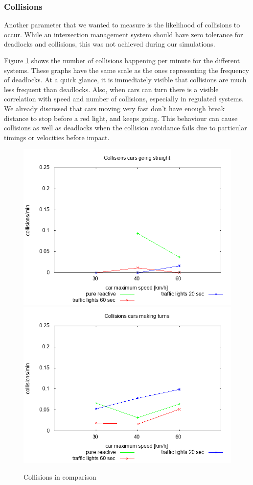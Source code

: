 \subsubsection{Collisions}
Another parameter that we wanted to measure is the likelihood of collisions to occur.
While an intersection management system should have zero tolerance for deadlocks and collisions, this was not achieved during our simulations.

Figure \ref{fig:collisions} shows the number of collisions happening per minute for the different systems.
These graphs have the same scale as the ones representing the frequency of deadlocks.
At a quick glance, it is immediately visible that collisions are much less frequent than deadlocks.
Also, when cars can turn there is a visible correlation with speed and number of collisions, especially in regulated systems.
We already discussed that cars moving very fast don't have enough break distance to stop before a red light, and keeps going.
This behaviour can cause collisions as well as deadlocks when the collision avoidance fails due to particular timings or velocities before impact.


\begin{figure}
\centering
\includegraphics[scale=0.35]{img/plot_collisionsstraight}
\includegraphics[scale=0.35]{img/plot_collisionsturns}
\caption{Collisions in comparison}
\label{fig:collisions}
\end{figure}




